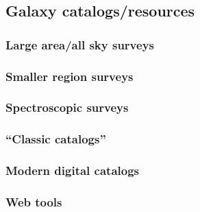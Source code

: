 \documentclass{article}
\begin{document}
\subsection{Galaxy catalogs/resources}
\subsubsection{Large area/all sky surveys}
\subsubsection{Smaller region surveys}
\subsubsection{Spectroscopic surveys}
\subsubsection{``Classic catalogs''}
\subsubsection{Modern digital catalogs}
\subsubsection{Web tools}
\end{document}
